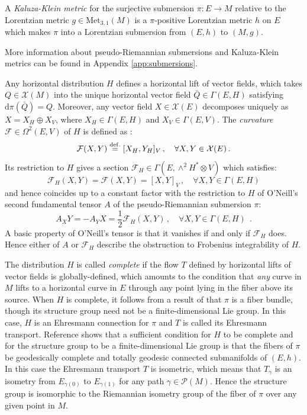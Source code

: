 \documentclass[10pt, cmp, numbook, final, a4paper]{svjour}
\newcommand{\eqdef}{\stackrel{{\rm def.}}{=}}
\def\dd{\mathrm{d}}
\newcommand{\be}{\begin{equation*}}
\newcommand{\ee}{\end{equation*}}
\def\cX{\mathcal{X}}
\def\cP{\mathcal{P}}
\def\cF{\mathcal{F}}
\def\cX{\mathcal{X}}
\def\Met{\mathrm{Met}}
\begin{document}
\begin{definition}
A {\em Kaluza-Klein metric} for the surjective submersion
$\pi:E\rightarrow M$ relative to the Lorentzian metric $g\in
\Met_{3,1}(M)$ is a $\pi$-positive Lorentzian metric $h$ on $E$
which makes $\pi$ into a Lorentzian submersion from $(E,h)$ to
$(M,g)$.
\end{definition}

\noindent More information about pseudo-Riemannian submersions and
Kaluza-Klein metrics can be found in Appendix \ref{app:submersions}.


Any horizontal distribution $H$ defines a horizontal lift of vector
fields, which takes $Q\in \cX(M)$ into the unique horizontal vector
field $\bar{Q}\in \Gamma(E,H)$ satisfying $\dd\pi(\bar{Q}) = Q$. Moreover, 
any vector field $X\in \cX(E)$ decomposes uniquely as $X=X_H\oplus X_V$, 
where $X_H\in \Gamma(E,H)$ and $X_V\in \Gamma(E,V)$. The
{\em curvature} $\cF\in \Omega^2(E,V)$ of $H$ is defined
as \cite{Michor}:
\be
\cF(X,Y)\eqdef [X_H,Y_H]_V\, , \quad \forall X,Y\in \cX(E)\, .
\ee
Its restriction to $H$ gives a section
$\cF_H\in \Gamma(E,\wedge^2H^\ast\otimes V)$ which satisfies:
\be
\cF_H(X,Y)=\cF(X,Y)=[X,Y]_V\, , \quad \forall X,Y\in \Gamma(E,H)
\ee
and hence coincides up to a constant factor with the restriction to
$H$ of O'Neill's second fundamental tensor $A$ \cite{ONeill} of the
pseudo-Riemannian submersion $\pi$:
\be
A_XY=-A_YX=\frac{1}{2}\cF_H(X,Y)\, , \quad \forall X,Y\in \Gamma(E,H)~~.
\ee
A basic property of O'Neill's tensor is that it vanishes if and only
if $\cF_H$ does. Hence either of $A$ or $\cF_H$ describe the
obstruction to Frobenius integrability of $H$.

The distribution $H$ is called {\em complete} if the flow $T$ defined
by horizontal lifts of vector fields is globally-defined, which
amounts to the condition that {\em any} curve in $M$ lifts to a
horizontal curve in $E$ through any point lying in the fiber above its
source.  When $H$ is complete, it follows from a result of
\cite{Ehresmann} that $\pi$ is a fiber bundle, though its structure
group need not be a finite-dimensional Lie group. In this case, $H$ is
an Ehresmann connection for $\pi$ and $T$ is called its Ehresmann
transport. Reference \cite{Reckziegel} shows that a sufficient
condition for $H$ to be complete and for the structure group to be a
finite-dimensional Lie group is that the fibers of $\pi$ be
geodesically complete and totally geodesic connected submanifolds of
$(E,h)$. In this case the Ehresmann transport $T$ is isometric, which
means that $T_\gamma$ is an isometry from $E_{\gamma(0)}$ to
$E_{\gamma(1)}$ for any path $\gamma\in \cP(M)$. Hence the structure
group is isomorphic to the Riemannian isometry group of the fiber of
$\pi$ over any given point in $M$. 
\end{document}
